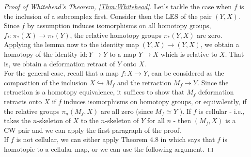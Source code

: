 \documentclass[reqno]{amsart}
\theoremstyle{definition}
\theoremstyle{remark}
\newcommand{\id}{{\mathrm{id}}}
\begin{document}
\begin{proof}[Proof of Whitehead's Theorem, \ref{Thm:Whitehead}]
    Let's tackle the case when $f$ is the inclusion
    of a subcomplex first. Consider then
    the LES of the pair $\left( Y,X \right) $. Since
    $f$ by assumption induces isomorphisms
    on all homotopy groups,
    $f_* \colon \pi_* (X) \to \pi_* (Y)$, the
    relative homotopy groups
    $\pi_* (Y,X)$ are zero. Applying the lemma now
    to the identity map $\left( Y,X \right) \to 
    \left( Y,X \right) $, we obtain a homotopy
    of the identity  $\id \colon Y \to Y$ to
    a map $Y \to X$ which is relative to
    $X$. That is, we obtain a deformation retract of
    $Y$ onto $X$.\\
    \linebreak
    For the general case, recall that
    a map $f \colon X \to Y$, can be considered
    as the composition of the
    inclusion $X \hookrightarrow M_f$ and the
    retraction $M_f \to Y$. Since
    the retraction is a homotopy equivalence,
    it suffices to show that $M_f$ deformation retracts
    onto $X$ if $f$ induces isomorphisms on homotopy
    groups, or equivalently, if the relative groups
    $\pi_n \left( M_f, X \right) $ are all zero (since
    $M_f \simeq Y$ ).
    If $f$ is cellular - i.e., takes the $n$-skeleton of
    $X$ to the $n$-skeleton of $Y$ for all
    $n$ - then $\left( M_f, X \right) $ is a CW pair and
    we can apply the first paragraph of the proof.\\
    If $f$ is not cellular, we can either apply
    Theorem 4.8 in \cite{Hatcher} which says
    that $f$ is homotopic to a cellular map, or we can use
    the following argument.


\end{proof}
\end{document}
